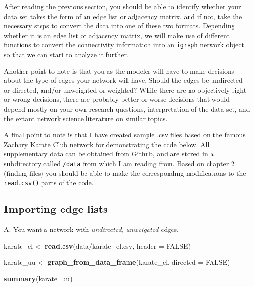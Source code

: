 \documentclass[
]{book}
\newenvironment{Shaded}{\begin{snugshade}}{\end{snugshade}}
\newcommand{\AttributeTok}[1]{\textcolor[rgb]{0.13,0.29,0.53}{#1}}
\newcommand{\ConstantTok}[1]{\textcolor[rgb]{0.56,0.35,0.01}{#1}}
\newcommand{\FunctionTok}[1]{\textcolor[rgb]{0.13,0.29,0.53}{\textbf{#1}}}
\newcommand{\NormalTok}[1]{#1}
\newcommand{\OtherTok}[1]{\textcolor[rgb]{0.56,0.35,0.01}{#1}}
\newcommand{\StringTok}[1]{\textcolor[rgb]{0.31,0.60,0.02}{#1}}
\begin{document}
After reading the previous section, you should be able to identify whether your data set takes the form of an edge list or adjacency matrix, and if not, take the necessary steps to convert the data into one of these two formats. Depending whether it is an edge list or adjacency matrix, we will make use of different functions to convert the connectivity information into an \texttt{igraph} network object so that we can start to analyze it further.

Another point to note is that you as the modeler will have to make decisions about the type of edges your network will have. Should the edges be undirected or directed, and/or unweighted or weighted? While there are no objectively right or wrong decisions, there are probably better or worse decisions that would depend mostly on your own research questions, interpretation of the data set, and the extant network science literature on similar topics.

A final point to note is that I have created sample .csv files based on the famous Zachary Karate Club network for demonstrating the code below. All supplementary data can be obtained from Github, and are stored in a subdirectory called \texttt{/data} from which I am reading from. Based on chapter 2 (finding files) you should be able to make the corresponding modifications to the \texttt{read.csv()} parts of the code.

\subsection{Importing edge lists}\label{importing-edge-lists}

A. You want a network with \emph{undirected, unweighted} edges.

\begin{Shaded}
\begin{Highlighting}[]
\NormalTok{karate\_el }\OtherTok{\textless{}{-}} \FunctionTok{read.csv}\NormalTok{(}\StringTok{\textquotesingle{}data/karate\_el.csv\textquotesingle{}}\NormalTok{, }\AttributeTok{header =} \ConstantTok{FALSE}\NormalTok{)}

\NormalTok{karate\_uu }\OtherTok{\textless{}{-}} \FunctionTok{graph\_from\_data\_frame}\NormalTok{(karate\_el, }\AttributeTok{directed =} \ConstantTok{FALSE}\NormalTok{)}

\FunctionTok{summary}\NormalTok{(karate\_uu)}
\end{Highlighting}
\end{Shaded}
\end{document}
